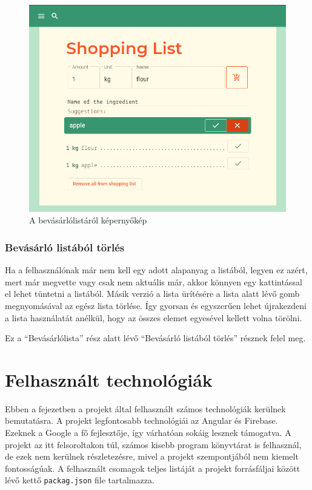 \documentclass[12pt]{report}
\theoremstyle{definition}
\begin{document}
\begin{figure}[H]%
    \centering
    \includegraphics[width=11.5cm]{pictures/web-shoppinglist.png}
	\caption{A bevásárlólistáról képernyőkép}%
    \label{fig:shoppinglist}%
\end{figure}


\subsection{Bevásárló listából törlés}
Ha a felhasználónak már nem kell egy adott alapanyag a listából, legyen ez azért, mert már megvette vagy csak nem aktuális már, akkor könnyen egy kattintással el lehet tüntetni a listából. Másik verzió a lista ürítésére a lista alatt lévő gomb megnyomásával az egész lista törlése. Így gyorsan és egyszerűen lehet újrakezdeni a lista használatát anélkül, hogy az összes elemet egyesével kellett volna törölni.

Ez  a “Bevásárlólista” rész alatt lévő “Bevásárló listából törlés” résznek felel meg. 


\chapter{Felhasznált technológiák}
Ebben a fejezetben a projekt által felhasznált számos technológiák kerülnek bemutatásra. A projekt legfontosabb technológiái az Angular és Firebase. 
Ezeknek a Google a fő fejlesztője, így várhatóan sokáig lesznek támogatva.
A projekt az itt felsoroltakon túl, számos kisebb program könyvtárat is felhasznál, de ezek nem kerülnek részletezésre, mivel a projekt szempontjából nem kiemelt fontosságúak.
A felhasznált csomagok teljes listáját a projekt forrásfáljai között lévő kettő \texttt{packag.json} file tartalmazza.
\end{document}
